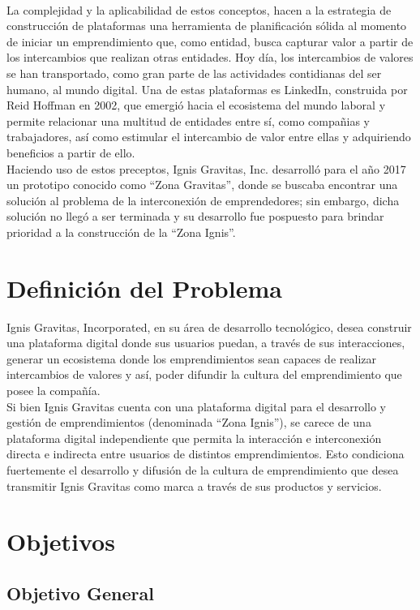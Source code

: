 \\
La complejidad y la aplicabilidad de estos conceptos, hacen a la estrategia de construcción de plataformas una herramienta de planificación sólida al momento de iniciar un emprendimiento que, como entidad, busca capturar valor a partir de los intercambios que realizan otras entidades. Hoy día, los intercambios de valores se han transportado, como gran parte de las actividades contidianas del ser humano, al mundo digital. Una de estas plataformas es LinkedIn, construida por Reid Hoffman en 2002, que emergió hacia el ecosistema del mundo laboral y permite relacionar una multitud de entidades entre sí, como compañias y trabajadores, así como estimular el intercambio de valor entre ellas y adquiriendo beneficios a partir de ello.
\\
Haciendo uso de estos preceptos, Ignis Gravitas, Inc. desarrolló para el año 2017 un prototipo conocido como “Zona Gravitas”, donde se buscaba encontrar una solución al problema de la interconexión de emprendedores; sin embargo, dicha solución no llegó a ser terminada y su desarrollo fue pospuesto para brindar prioridad a la construcción de la “Zona Ignis”.


\section*{Definición del Problema}

Ignis Gravitas, Incorporated, en su área de desarrollo tecnológico, desea construir una plataforma digital donde sus usuarios puedan, a través de sus interacciones, generar un ecosistema donde los emprendimientos sean capaces de realizar intercambios de valores y así, poder  difundir la cultura del emprendimiento que posee la compañía.
\\
Si bien Ignis Gravitas cuenta con una plataforma digital para el desarrollo y gestión de emprendimientos (denominada “Zona Ignis”), se carece de una  plataforma digital independiente que permita la interacción e interconexión directa e indirecta entre usuarios de distintos emprendimientos. Esto condiciona fuertemente el desarrollo y difusión de la cultura de emprendimiento que desea transmitir Ignis Gravitas como marca a través de sus productos y servicios.

\section*{Objetivos}

\subsection*{Objetivo General}

